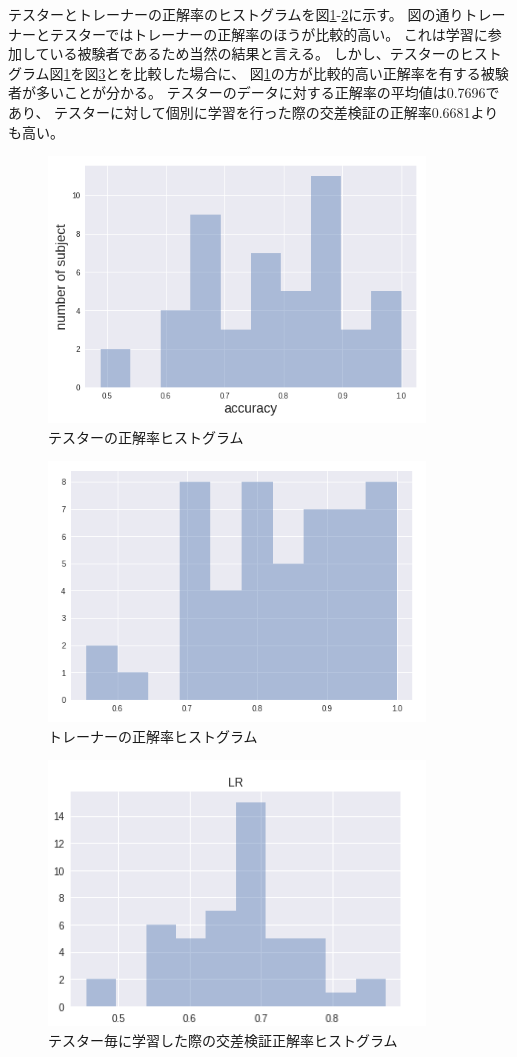 テスターとトレーナーの正解率のヒストグラムを図\ref{fig:tesacc}-\ref{fig:tracc}に示す。
図の通りトレーナーとテスターではトレーナーの正解率のほうが比較的高い。
これは学習に参加している被験者であるため当然の結果と言える。
しかし、テスターのヒストグラム図\ref{fig:tesacc}を図\ref{fig:croshis}とを比較した場合に、
図\ref{fig:tesacc}の方が比較的高い正解率を有する被験者が多いことが分かる。
テスターのデータに対する正解率の平均値は0.7696であり、
テスターに対して個別に学習を行った際の交差検証の正解率0.6681よりも高い。
\begin{figure}[p]
    \centering
    \includegraphics[width=10cm]{images/tester_acc.png}
    \caption{テスターの正解率ヒストグラム}
    \label{fig:tesacc}
\end{figure}
\begin{figure}[p]
    \centering
    \includegraphics[width=10cm]{images/traineracc.png}
    \caption{トレーナーの正解率ヒストグラム}
    \label{fig:tracc}
\end{figure}
\begin{figure}[p]
    \centering
    \includegraphics[width=10cm]{images/crosshist.png}
    \caption{テスター毎に学習した際の交差検証正解率ヒストグラム}
    \label{fig:croshis}
\end{figure}

